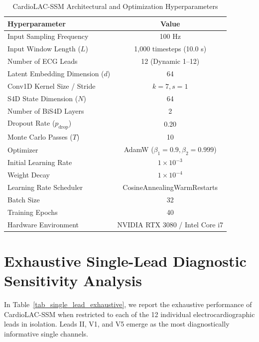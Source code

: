 \documentclass[journal,11pt,draftclsnofoot,onecolumn]{IEEEtran}
\begin{document}
\begin{table}[!h]
\caption{CardioLAC-SSM Architectural and Optimization Hyperparameters}
\label{tab_hyperparams}
\centering
\begin{tabular}{lc}
\toprule
\textbf{Hyperparameter} & \textbf{Value} \\
\midrule
Input Sampling Frequency & 100 Hz \\
Input Window Length ($L$) & 1,000 timesteps (10.0 s) \\
Number of ECG Leads & 12 (Dynamic 1--12) \\
Latent Embedding Dimension ($d$) & 64 \\
Conv1D Kernel Size / Stride & $k=7, s=1$ \\
S4D State Dimension ($N$) & 64 \\
Number of BiS4D Layers & 2 \\
Dropout Rate ($p_{\text{drop}}$) & 0.20 \\
Monte Carlo Passes ($T$) & 10 \\
Optimizer & AdamW ($\beta_1=0.9, \beta_2=0.999$) \\
Initial Learning Rate & $1 \times 10^{-3}$ \\
Weight Decay & $1 \times 10^{-4}$ \\
Learning Rate Scheduler & CosineAnnealingWarmRestarts \\
Batch Size & 32 \\
Training Epochs & 40 \\
Hardware Environment & NVIDIA RTX 3080 / Intel Core i7 \\
\bottomrule
\end{tabular}
\end{table}


\section{Exhaustive Single-Lead Diagnostic Sensitivity Analysis}
\label{app_single_lead}
In Table~\ref{tab_single_lead_exhaustive}, we report the exhaustive performance of CardioLAC-SSM when restricted to each of the 12 individual electrocardiographic leads in isolation. Leads II, V1, and V5 emerge as the most diagnostically informative single channels.
\end{document}
